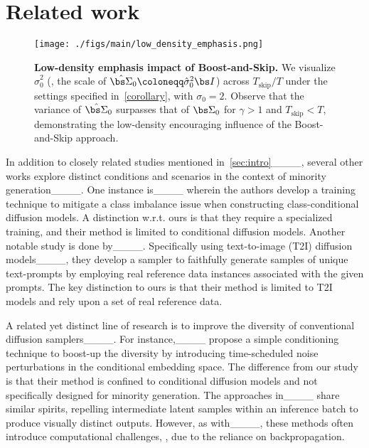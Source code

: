 \section{Related work}
\label{sec:related_work}

\setlength{\columnsep}{7.0pt}%
\begin{wrapfigure}[21]{r}{0.45\linewidth}
    \centering
   \vspace{-3mm}
    \texttt{[image: ./figs/main/low\_density\_emphasis.png]}
 \vspace{-7mm}
    \caption{\textbf{Low-density emphasis impact of Boost-and-Skip.} We visualize $\hat{\sigma}_0^2$ (\ie, the scale of $\hat{\bs \Sigma}_0 \coloneqq \hat{\sigma}_0^2 {\bs I}$) across $T_{\text{skip}} / T$ under the settings specified in~\cref{corollary}, with $\sigma_0 = 2$. Observe that the variance of $\hat{\bs \Sigma}_0$ surpasses that of ${\bs \Sigma}_0$ for $\gamma > 1$ and $T_{\text{skip}} < T$, demonstrating the low-density encouraging influence of the Boost-and-Skip approach.}
    \label{fig:hat_sigma_0_vs_T_s}
\end{wrapfigure}

In addition to closely related studies mentioned in~\cref{sec:intro}____, several other works explore distinct conditions and scenarios in the context of minority generation____. One instance is____ wherein the authors develop a training technique to mitigate a class imbalance issue when constructing class-conditional diffusion models. A distinction w.r.t. ours is that they require a specialized training, and their method is limited to conditional diffusion models. Another notable study is done by____. Specifically using text-to-image (T2I) diffusion models____, they develop a sampler to faithfully generate samples of unique text-prompts by employing real reference data instances associated with the given prompts. The key distinction to ours is that their method is limited to T2I models and rely upon a set of real reference data. 

A related yet distinct line of research is to improve the diversity of conventional diffusion samplers____. For instance,____ propose a simple conditioning technique to boost-up the diversity by introducing time-scheduled noise perturbations in the conditional embedding space. The difference from our study is that their method is confined to conditional diffusion models and not specifically designed for minority generation. The approaches in____ share similar spirits, repelling intermediate latent samples within an inference batch to produce visually distinct outputs. However, as with____, these methods often introduce computational challenges, \eg, due to the reliance on backpropagation.